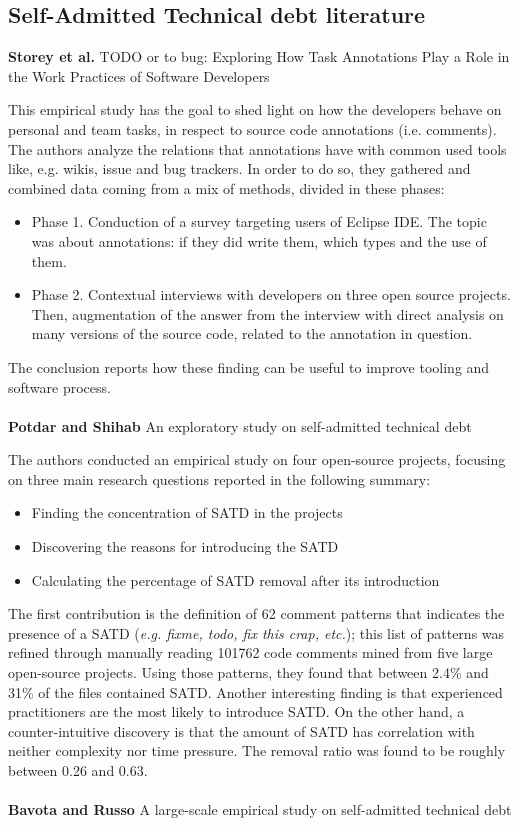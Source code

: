 \subsection{Self-Admitted Technical debt literature}
\textbf{Storey et al.} \cite{storey2008todo} TODO or to bug: Exploring How Task Annotations Play a Role in the Work Practices of Software Developers

This empirical study has the goal to shed light on how the developers behave on personal and team tasks, in respect to source code annotations (i.e. comments).
The authors analyze the relations that annotations have with common used tools like, e.g. wikis, issue and bug trackers. In order to do so, they gathered and combined data coming from a mix of methods, divided in these phases:
\begin{itemize}
    \item Phase 1. Conduction of a survey targeting users of Eclipse IDE. The topic was about annotations: if they did write them, which types and the use of them.
    \item Phase 2. Contextual interviews with developers on three open source projects. Then, augmentation of the answer from the interview with direct analysis on many versions of the source code, related to the annotation in question.
\end{itemize}

The conclusion reports how these finding can be useful to improve tooling and software process.
\\
\\%
\textbf{Potdar and Shihab} \cite{potdar2014exploratory} An exploratory study on self-admitted technical debt

The authors conducted an empirical study on four open-source projects, focusing on three main research questions reported in the following summary:
\begin{itemize}
    \item Finding the concentration of SATD in the projects
    \item Discovering the reasons for introducing the SATD
    \item Calculating the percentage of SATD removal after its introduction
\end{itemize}

The first contribution is the definition of 62 comment patterns that indicates the presence of a SATD (\emph{e.g. fixme, todo, fix this crap, etc.}); this list of patterns was refined through manually reading 101762 code comments mined from five large open-source projects. 
Using those patterns, they found that between 2.4\% and 31\% of the files contained SATD. Another interesting finding is that experienced practitioners are the most likely to introduce SATD. On the other hand, a counter-intuitive discovery is that the amount of SATD has correlation with neither complexity nor time pressure. The removal ratio was found to be roughly between 0.26 and 0.63.
\\
\\
\textbf{Bavota and Russo} \cite{bavota2016large} A large-scale empirical study on self-admitted technical debt

